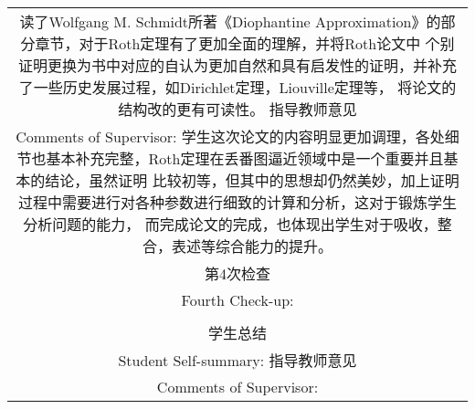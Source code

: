 \begin{tabular}{|c|}
读了Wolfgang M. Schmidt所著《Diophantine Approximation》的部分章节，对于Roth定理有了更加全面的理解，并将Roth论文中
个别证明更换为书中对应的自认为更加自然和具有启发性的证明，并补充了一些历史发展过程，如Dirichlet定理，Liouville定理等，
将论文的结构改的更有可读性。
指导教师意见 \\
Comments of Supervisor:
学生这次论文的内容明显更加调理，各处细节也基本补充完整，Roth定理在丢番图逼近领域中是一个重要并且基本的结论，虽然证明
比较初等，但其中的思想却仍然美妙，加上证明过程中需要进行对各种参数进行细致的计算和分析，这对于锻炼学生分析问题的能力，
而完成论文的完成，也体现出学生对于吸收，整合，表述等综合能力的提升。
\\
第4次检查 \\
Fourth Check-up:
\\
\\
学生总结 \\
Student Self-summary:
指导教师意见 \\
Comments of Supervisor:
\\
\end{tabular}